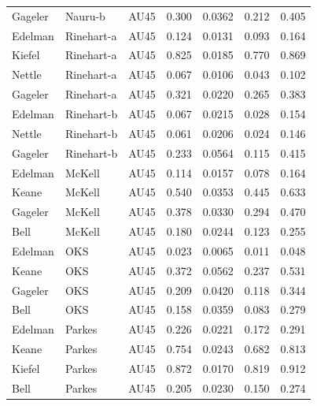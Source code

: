 \documentclass{monashthesis}
\begin{document}
\begin{center}
\begin{longtable}{lllllll}
Gageler & Nauru-b & AU45 & 0.300 & 0.0362 & 0.212 & 0.405 \\
Edelman & Rinehart-a & AU45 & 0.124 & 0.0131 & 0.093 & 0.164 \\
Kiefel & Rinehart-a & AU45 & 0.825 & 0.0185 & 0.770 & 0.869 \\
Nettle & Rinehart-a & AU45 & 0.067 & 0.0106 & 0.043 & 0.102 \\
Gageler & Rinehart-a & AU45 & 0.321 & 0.0220 & 0.265 & 0.383 \\
Edelman & Rinehart-b & AU45 & 0.067 & 0.0215 & 0.028 & 0.154 \\
Nettle & Rinehart-b & AU45 & 0.061 & 0.0206 & 0.024 & 0.146 \\
Gageler & Rinehart-b & AU45 & 0.233 & 0.0564 & 0.115 & 0.415 \\
Edelman & McKell & AU45 & 0.114 & 0.0157 & 0.078 & 0.164 \\
Keane & McKell & AU45 & 0.540 & 0.0353 & 0.445 & 0.633 \\
Gageler & McKell & AU45 & 0.378 & 0.0330 & 0.294 & 0.470 \\
Bell & McKell & AU45 & 0.180 & 0.0244 & 0.123 & 0.255 \\
Edelman & OKS & AU45 & 0.023 & 0.0065 & 0.011 & 0.048 \\
Keane & OKS & AU45 & 0.372 & 0.0562 & 0.237 & 0.531 \\
Gageler & OKS & AU45 & 0.209 & 0.0420 & 0.118 & 0.344 \\
Bell & OKS & AU45 & 0.158 & 0.0359 & 0.083 & 0.279 \\
Edelman & Parkes & AU45 & 0.226 & 0.0221 & 0.172 & 0.291 \\
Keane & Parkes & AU45 & 0.754 & 0.0243 & 0.682 & 0.813 \\
Kiefel & Parkes & AU45 & 0.872 & 0.0170 & 0.819 & 0.912 \\
Bell & Parkes & AU45 & 0.205 & 0.0230 & 0.150 & 0.274 \\
\end{longtable}
\end{center}
\end{document}
